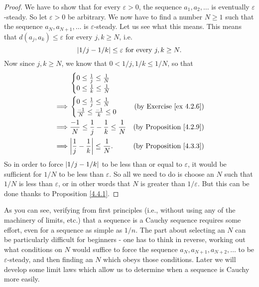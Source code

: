 \begin{proof}
    We have to show that for every \(\varepsilon > 0\), the sequence \(a_1, a_2, \dots\) is eventually \(\varepsilon\)-steady.
    So let \(\varepsilon > 0\) be arbitrary.
    We now have to find a number \(N \geq 1\) such that the sequence \(a_N, a_{N + 1}, \dots\) is \(\varepsilon\)-steady.
    Let us see what this means.
    This means that \(d(a_j, a_k) \leq \varepsilon\) for every \(j, k \geq N\), i.e.
    \[
        \abs*{1 / j - 1 / k} \leq \varepsilon \text{ for every } j, k \geq N.
    \]
    Now since \(j, k \geq N\), we know that \(0 < 1 / j, 1 / k \leq 1 / N\), so that
    \begin{align*}
                 &
        \begin{cases}
            0 \leq \frac{1}{j} \leq \frac{1}{N} \\
            0 \leq \frac{1}{k} \leq \frac{1}{N} \\
        \end{cases}
        \\
        \implies &
        \begin{cases}
            0 \leq \frac{1}{j} \leq \frac{1}{N}   \\
            \frac{-1}{N} \leq \frac{-1}{k} \leq 0 \\
        \end{cases}
                 & \text{(by Exercise \ref{ex 4.2.6})}                                                                \\
        \implies & \frac{-1}{N} \leq \frac{1}{j} - \frac{1}{k} \leq \frac{1}{N} & \text{(by Proposition \ref{4.2.9})} \\
        \implies & \abs*{\frac{1}{j} - \frac{1}{k}} \leq \frac{1}{N}.           & \text{(by Proposition \ref{4.3.3})}
    \end{align*}
    So in order to force \(\abs*{1 / j - 1 / k}\) to be less than or equal to \(\varepsilon\), it would be sufficient for \(1 / N\) to be less than \(\varepsilon\).
    So all we need to do is choose an \(N\) such that \(1 / N\) is less than \(\varepsilon\), or in other words that \(N\) is greater than \(1 / \varepsilon\).
    But this can be done thanks to Proposition \ref{4.4.1}.
\end{proof}

\begin{note}
    As you can see, verifying from first principles (i.e., without using any of the machinery of limits, etc.) that a sequence is a Cauchy sequence requires some effort, even for a sequence as simple as \(1 / n\).
    The part about selecting an \(N\) can be particularly difficult for beginners
    - one has to think in reverse, working out what conditions on \(N\) would suffice to force the sequence \(a_N, a_{N + 1}, a_{N + 2}, \dots\) to be \(\varepsilon\)-steady, and then finding an \(N\) which obeys those conditions.
    Later we will develop some limit laws which allow us to determine when a sequence is Cauchy more easily.
\end{note}

